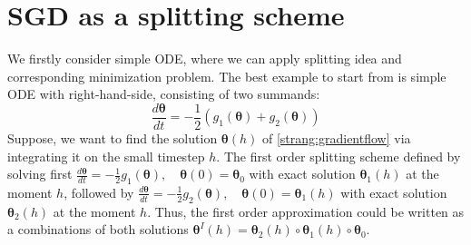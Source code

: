 \documentclass{article}
\newcommand{\vect}[1]{\boldsymbol{\mathbf{#1}}}
\begin{document}

\section{SGD as a splitting scheme}

We firstly consider simple ODE, where we can apply splitting idea and corresponding minimization problem. The best example to start from is simple ODE with right-hand-side, consisting of two summands:
\begin{equation}
    \frac{d \vect{\theta}}{d t} = - \frac{1}{2} \left( g_1(\vect{\theta}) + g_2(\vect{\theta})\right)
    \label{strang:gradientflow}
\end{equation}
Suppose, we want to find the solution $\vect{\theta}(h)$ of \eqref{strang:gradientflow} via integrating it on the small timestep $h$. The first order splitting scheme defined by solving first $\frac{d \vect{\theta}}{d t} = - \frac{1}{2} g_1(\vect{\theta}), \quad \vect{\theta}(0) = \vect{\theta}_0$ with exact solution $\vect{\theta}_1(h)$ at the moment $h$, followed by $\frac{d \vect{\theta}}{d t} = - \frac{1}{2} g_2(\vect{\theta}), \quad \vect{\theta}(0) = \vect{\theta}_1(h)$ with exact solution $\vect{\theta}_2(h)$ at the moment $h$. Thus, the first order approximation could be written as a combinations of both solutions $\vect{\theta}^I(h) = \vect{\theta}_2(h) \circ \vect{\theta}_1(h) \circ \vect{\theta}_0$.
\end{document}
